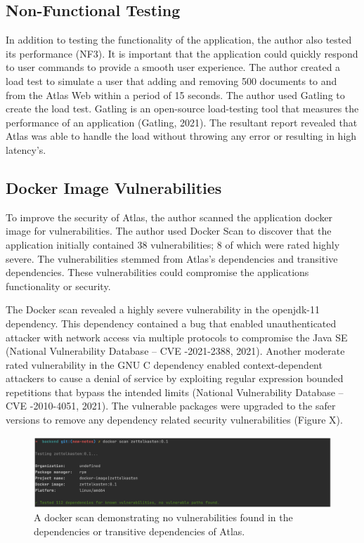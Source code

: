 \documentclass{article}
\begin{document}
\subsection{Non-Functional Testing}
In addition to testing the functionality of the application, the author also tested its performance (NF3). It is important that the application could quickly respond to user commands to provide a smooth user experience. The author created a load test to simulate a user that adding and removing 500 documents to and from the Atlas Web within a period of 15 seconds. The author used Gatling to create the load test. Gatling is an open-source load-testing tool that measures the performance of an application (Gatling, 2021). The resultant report revealed that Atlas was able to handle the load without throwing any error or resulting in high latency's.

\subsection{Docker Image Vulnerabilities}

To improve the security of Atlas, the author scanned the application docker image for vulnerabilities. The author used Docker Scan to discover that the application initially contained 38 vulnerabilities; 8 of which were rated highly severe. The vulnerabilities stemmed from Atlas’s dependencies and transitive dependencies. These vulnerabilities could compromise the applications functionality or security. 

The Docker scan revealed a highly severe vulnerability in the openjdk-11 dependency. This dependency contained a bug that enabled unauthenticated attacker with network access via multiple protocols to compromise the Java SE (National Vulnerability Database – CVE -2021-2388, 2021). Another moderate rated vulnerability in the GNU C dependency enabled context-dependent attackers to cause a denial of service by exploiting regular expression bounded repetitions that bypass the intended limits (National Vulnerability Database – CVE -2010-4051, 2021). The vulnerable packages were upgraded to the safer versions to remove any dependency related security vulnerabilities (Figure X).

\begin{figure}[!htb]
  \centering
      \includegraphics[width=1\textwidth]{images/vulnerabilities.png}
  \caption{A docker scan demonstrating no vulnerabilities found in the dependencies or transitive dependencies of Atlas.}
\end{figure}
\end{document}
